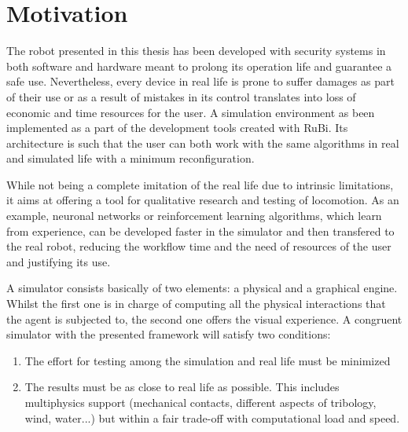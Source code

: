\section{Motivation} %
\label{sec:sim_motivation}
The robot presented in this thesis has been developed with security systems in both software and hardware meant to prolong its operation life and guarantee a safe use. 
Nevertheless, every device in real life is prone to suffer damages as part of their use or as a result of mistakes in its control translates into loss of economic and time resources for the user.
A simulation environment as been implemented as a part of the development tools created with RuBi.
Its architecture is such that the user can both work with the same algorithms in real and simulated life with a minimum reconfiguration.

While not being a complete imitation of the real life due to intrinsic limitations, it aims at offering a tool for qualitative research and testing of locomotion.
As an example, neuronal networks or reinforcement learning algorithms, which learn from experience, can be developed faster in the simulator and then transfered to the real robot, reducing the workflow time and the need of resources of the user and justifying its use.

A simulator consists basically of two elements: a physical and a graphical engine.
Whilst the first one is in charge of computing all the physical interactions that the agent is subjected to, the second one offers the visual experience.
A congruent simulator with the presented framework will satisfy two conditions:
\begin{enumerate}
  \item The effort for testing among the simulation and real life must be minimized
  \item The results must be as close to real life as possible. This includes multiphysics support (mechanical contacts, different aspects of tribology, wind, water...) but within a fair trade-off with computational load and speed.
\end{enumerate}

